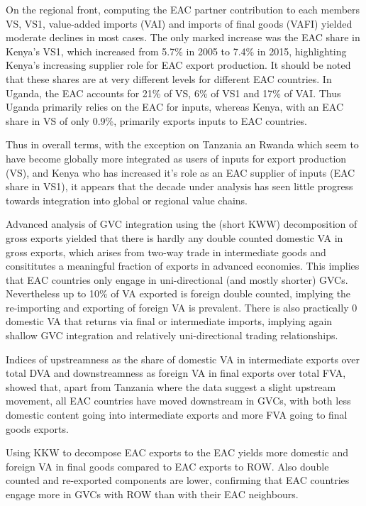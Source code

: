 \documentclass[a4paper]{article}
\begin{document}
On the regional front, computing the EAC partner contribution to each members VS, VS1, value-added imports (VAI) and imports of final goods (VAFI) yielded moderate declines in most cases. The only marked increase was the EAC share in Kenya's VS1, which increased from 5.7\% in 2005 to 7.4\% in 2015, highlighting Kenya's increasing supplier role for EAC export production. It should be noted that these shares are at very different levels for different EAC countries. In Uganda, the EAC accounts for 21\% of VS, 6\% of VS1 and 17\% of VAI. Thus Uganda primarily relies on the EAC for inputs, whereas Kenya, with an EAC share in VS of only 0.9\%, primarily exports inputs to EAC countries. \newline

Thus in overall terms, with the exception on Tanzania an Rwanda which seem to have become globally more integrated as users of inputs for export production (VS), and Kenya who has increased it's role as an EAC supplier of inputs (EAC share in VS1), it appears that the decade under analysis has seen little progress towards integration into global or regional value chains.  \newline

Advanced analysis of GVC integration using the \citet{koopman2014tracing} (short KWW) decomposition of gross exports yielded that there is hardly any double counted domestic VA in gross exports, which arises from two-way trade in intermediate goods and consititutes a meaningful fraction of exports in advanced economies. This implies that EAC countries only engage in uni-directional (and mostly shorter) GVCs. Nevertheless up to 10\% of VA exported is foreign double counted, implying the re-importing and exporting of foreign VA is prevalent. There is also practically 0 domestic VA that returns via final or intermediate imports, implying again shallow GVC integration and relatively uni-directional trading relationships. \newline
 
 Indices of upstreamness as the share of domestic VA in intermediate exports over total DVA and downstreamness as foreign VA in final exports over total FVA, showed that, apart from Tanzania where the data suggest a slight upstream movement, all EAC countries have moved downstream in GVCs, with both less domestic content going into intermediate exports and more FVA going to final goods exports. \newline
 
 Using KKW to decompose EAC exports to the EAC yields more domestic and foreign VA in final goods compared to EAC exports to ROW. Also double counted and re-exported components are lower, confirming that EAC countries engage more in GVCs with ROW than with their EAC neighbours. \newline
 
\end{document}
